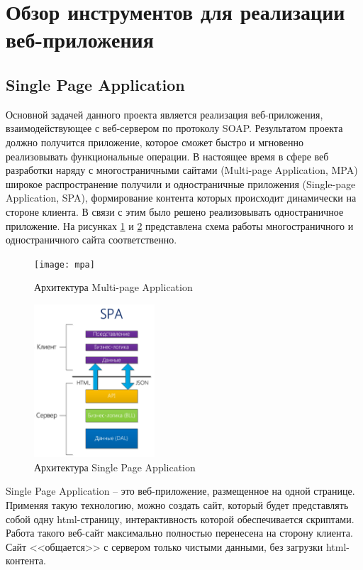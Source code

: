 \section {Обзор инструментов для реализации веб-приложения}

\subsection{Single Page Application}

Основной задачей данного проекта является реализация веб-приложения, взаимодействующее с веб-сервером по протоколу SOAP. Результатом проекта должно получится приложение, которое сможет быстро и мгновенно реализовывать функциональные операции. В настоящее время в сфере веб разработки наряду с многостраничными сайтами (Multi-page Application, MPA) широкое распространение получили и одностраничные приложения (Single-page Application, SPA), формирование контента которых происходит динамически на стороне клиента. В связи с этим было решено реализовывать одностраничное приложение. На рисунках  \ref{mpa} и  \ref{spa} представлена схема работы многостраничного и одностраничного сайта соответственно.

\begin{figure}[ht]
\center\texttt{[image: mpa]}
\caption{Архитектура Multi-page Application}\label{mpa}
\end{figure}

\begin{figure}[ht]
\center\includegraphics[width=0.4\textwidth]{spa}
\caption{Архитектура Single Page Application}\label{spa}
\end{figure}

Single Page Application -- это веб-приложение, размещенное на одной странице. Применяя такую технологию, можно создать сайт,  который будет представлять собой одну html-страницу, интерактивность которой обеспечивается скриптами. Работа такого веб-сайт максимально полностью перенесена на сторону клиента. Сайт <<общается>> с сервером только чистыми данными, без загрузки html-контента.
 
